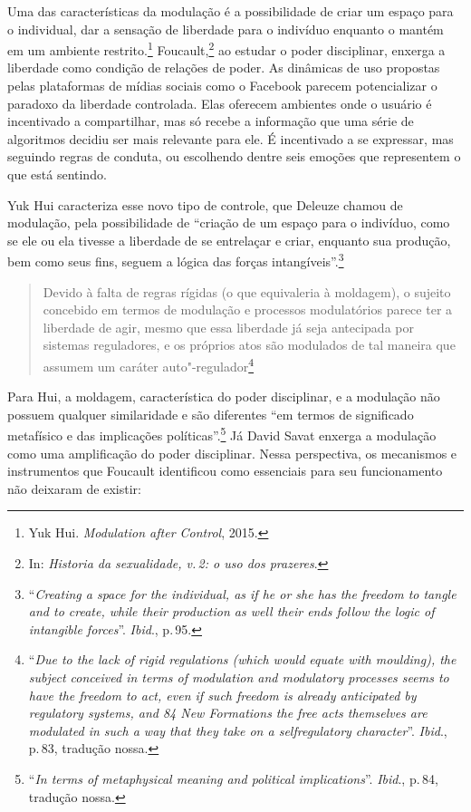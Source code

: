 Uma das características da modulação é a possibilidade de criar um
espaço para o individual, dar a sensação de liberdade para o indivíduo
enquanto o mantém em um ambiente restrito.\footnote{Yuk Hui. \textit{Modulation after Control}, 2015.}
Foucault,\footnote{In: \textit{Historia da sexualidade, v.\,2: o uso dos prazeres}.} ao estudar o poder disciplinar, enxerga a liberdade como condição de
relações de poder. As dinâmicas de uso propostas pelas plataformas de
mídias sociais como o Facebook parecem potencializar o paradoxo da
liberdade controlada. Elas oferecem ambientes onde o usuário é
incentivado a compartilhar, mas só recebe a informação que uma série de
algoritmos decidiu ser mais relevante para ele. É incentivado a se
expressar, mas seguindo regras de conduta, ou escolhendo dentre seis
emoções que representem o que está sentindo.

Yuk Hui caracteriza esse novo tipo de controle, que Deleuze
chamou de modulação, pela possibilidade de ``criação de um espaço
para o indivíduo, como se ele ou ela tivesse a liberdade de se
entrelaçar e criar, enquanto sua produção, bem como seus fins, seguem a
lógica das forças intangíveis''.\footnote{``\textit{Creating a space for the
  individual, as if he or she has the freedom to tangle and to create,
  while their production as well their ends follow the logic of
  intangible forces}''. \textit{Ibid}., p.\,95.}

\begin{quote}
Devido à falta de regras rígidas (o que equivaleria à moldagem), o
sujeito concebido em termos de modulação e processos modulatórios parece
ter a liberdade de agir, mesmo que essa liberdade já seja antecipada por
sistemas reguladores, e os próprios atos são modulados de tal maneira
que assumem um caráter auto"-regulador\footnote{``\textit{Due to the lack of
  rigid regulations (which would equate with moulding), the subject
  conceived in terms of modulation and modulatory processes seems to
  have the freedom to act, even if such freedom is already anticipated
  by regulatory systems, and 84 New Formations the free acts themselves
  are modulated in such a way that they take on a selfregulatory
  character}''. \textit{Ibid}., p.\,83, tradução nossa.}
\end{quote}

Para Hui, a moldagem, característica do poder disciplinar, e a modulação não
possuem qualquer similaridade e são diferentes ``em termos de
significado metafísico e das implicações políticas''.\footnote{``\textit{In terms
  of metaphysical meaning and political implications}''. \textit{Ibid}., p.\,84, tradução
nossa.} Já David Savat enxerga a modulação como uma amplificação do poder disciplinar. Nessa perspectiva, os mecanismos e instrumentos que Foucault identificou como
essenciais para seu funcionamento não deixaram de existir:

